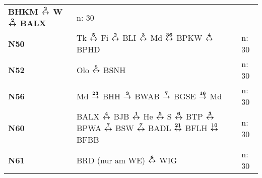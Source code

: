 \begin{minipage}[t]{0.45\textwidth}
\begin{tabular}{>{\bfseries}L{1.2cm}L{9.0cm}L{3.0cm}}
                BHKM $\boldsymbol{\overset{2}{\leftrightarrow}}$ W $\boldsymbol{\overset{2}{\leftrightarrow}}$ BALX                                                                                                                                 & n: 30                      \\
\nbus{} N50   & Tk $\boldsymbol{\overset{5}{\leftrightarrow}}$ Fi $\boldsymbol{\overset{2}{\leftrightarrow}}$ BLI $\boldsymbol{\overset{3}{\leftrightarrow}}$ Md $\boldsymbol{\overset{36}{\leftrightarrow}}$ BPKW $\boldsymbol{\overset{4}{\leftrightarrow}}$ BPHD                                                                                 & n: 30                      \\
\nbus{} N52   & Olo $\boldsymbol{\overset{5}{\leftrightarrow}}$ BSNH                                                                                                                                                & n: 30                      \\
\nbus{} N56   & Md $\boldsymbol{\overset{23}{\rightarrow}}$ BHH $\boldsymbol{\overset{3}{\rightarrow}}$ BWAB $\boldsymbol{\overset{7}{\rightarrow}}$ BGSE $\boldsymbol{\overset{16}{\rightarrow}}$ Md                                                                                               & n: 30                      \\
\nbus{} N60   & BALX $\boldsymbol{\overset{4}{\leftrightarrow}}$ BJB $\boldsymbol{\overset{1}{\leftrightarrow}}$ He $\boldsymbol{\overset{5}{\leftrightarrow}}$ S $\boldsymbol{\overset{6}{\leftrightarrow}}$ BTP $\boldsymbol{\overset{3}{\leftrightarrow}}$ BPWA $\boldsymbol{\overset{7}{\leftrightarrow}}$ BSW $\boldsymbol{\overset{7}{\leftrightarrow}}$ BADL 
$\boldsymbol{\overset{21}{\leftrightarrow}}$ BFLH $\boldsymbol{\overset{10}{\leftrightarrow}}$ BFBB                                                                               & n: 30 \\
\nbus{} N61   & BRD (nur am WE) $\boldsymbol{\overset{8}{\leftrightarrow}}$ WIG                                     & n: 30                      \\
\hline
\end{tabular}
\end{minipage}
\begin{minipage}[t]{0.05\textwidth}
\phantom{Tor}
\end{minipage}

